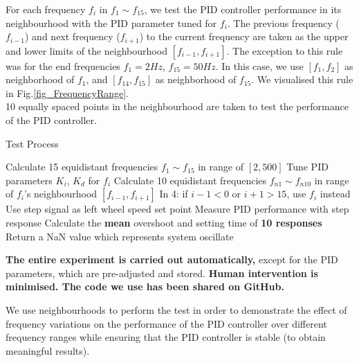 \documentclass[conference]{IEEEtran}
\begin{document}

For each frequency $f_{i}$ in $f_{1}\sim f_{15}$, we test the PID controller performance in its neighbourhood with the PID parameter tuned for $f_{i}$. The previous frequency ($f_{i-1}$) and next frequency ($f_{i+1}$) to the current frequency are taken as the upper and lower limits of the neighbourhood $[f_{i-1}, f_{i+1}]$. The exception to this rule was for the end frequencies $f_{1} = 2Hz$, $f_{15} = 50Hz$. In this case, we use $[f_{1}, f_{2}]$ as neighborhood of $f_{1}$, and $[f_{14}, f_{15}]$ as neighborhood of $f_{15}$. We visualised this rule in Fig.\ref{fig_FrequencyRange}.\\ 
10 equally spaced points in the neighbourhood are taken to test the performance of the PID controller.

\begin{algorithm}
	\caption{Test Process}\label{TestMethod}
	\begin{algorithmic}[1]
        \State Calculate 15  equidistant frequencies $f_{1}\sim f_{15}$ in range of $[2,500]$
                \State Tune PID parameters $K_{i}$, $K_{d}$ for $f_{i}$
                \State Calculate 10 equidistant frequencies $f_{n1}\sim f_{n10}$ in range of $f_{i}$'s neighbourhood $[f_{i-1},f_{i+1}]$
                \State In 4: if $i-1<0$ or $i+1>15$, use $f_{i}$ instead
				\State Use step signal as left wheel speed set point
                \State Measure PID performance with step response
                \State Calculate the \textbf{mean} overshoot and setting time of \textbf{10 responses}
                 Return a NaN value which represents system oscillate        
                \EndIf
			\EndFor
		\EndFor
	\end{algorithmic} 
\end{algorithm}

 \textbf{The entire experiment is carried out automatically,} except for the PID parameters, which are pre-adjusted and stored. \textbf{Human intervention is minimised. The code we use has been shared on GitHub.} 
 
We use neighbourhoods to perform the test in order to demonstrate the effect of frequency variations on the performance of the PID controller over different frequency ranges while ensuring that the PID controller is stable (to obtain meaningful results).
\end{document}
